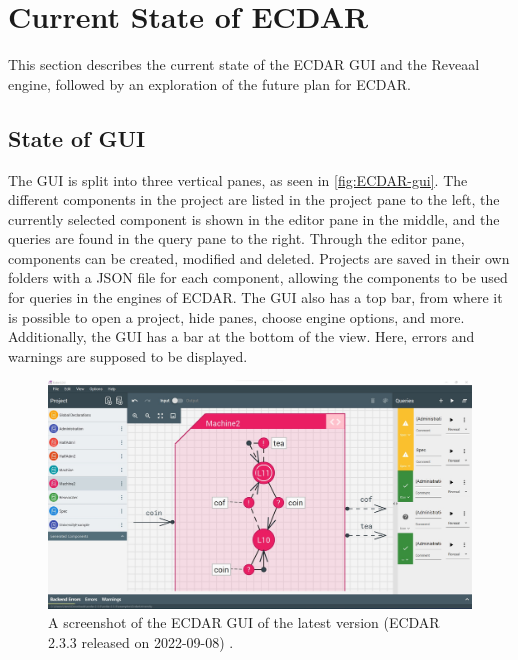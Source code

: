 \section{Current State of ECDAR}
This section describes the current state of the ECDAR GUI and the Reveaal engine, followed by an exploration of the future plan for ECDAR.

\subsection{State of GUI} 
The GUI is split into three vertical panes, as seen in \autoref{fig:ECDAR-gui}. The different components in the project are listed in the project pane to the left, the currently selected component is shown in the editor pane in the middle, and the queries are found in the query pane to the right. Through the editor pane, components can be created, modified and deleted. Projects are saved in their own folders with a JSON file for each component, allowing the components to be used for queries in the engines of ECDAR.
The GUI also has a top bar, from where it is possible to open a project, hide panes, choose engine options, and more.  
Additionally, the GUI has a bar at the bottom of the view. Here, errors and warnings are supposed to be displayed.

\begin{figure}[H]
    \centering
    \includegraphics[width=1\textwidth]{common/figures/ecdar-overview.jpg}
    \caption{A screenshot of the ECDAR GUI of the latest version (ECDAR 2.3.3 released on 2022-09-08) \cite{ECDARNETreleasenotes}.}
    \label{fig:ECDAR-gui}
\end{figure}

